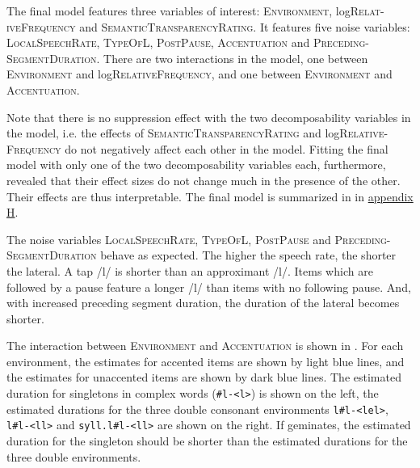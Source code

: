 The final model features three variables of interest: \textsc{Environment}, log\textsc{Relat-iveFrequency} and \textsc{SemanticTransparencyRating}. It features five noise variables: \textsc{LocalSpeechRate}, \textsc{TypeOfL}, \textsc{PostPause}, \textsc{Accentuation} and \textsc{Preceding-SegmentDuration}. 
There are two interactions in the model, one between \textsc{Environment} and log\textsc{RelativeFrequency}, and one between \textsc{Environment} and \textsc{Accentuation}. 

Note that there is no suppression effect with the two decomposability variables in the model, i.e. the effects of  \textsc{SemanticTransparencyRating} and log\textsc{Relative- Frequency} do not negatively affect each other in the model. Fitting the final model with only one of the two decomposability variables each, furthermore, revealed that their effect sizes do not change much in the presence of the other. Their effects are thus interpretable.
The final model is summarized in  in \hyperref[Appendix H: Model Summaries Experiment]{appendix H}.

The noise variables \textsc{LocalSpeechRate}, \textsc{TypeOfL}, \textsc{PostPause} and \textsc{Preceding- SegmentDuration} behave as expected. The higher the speech rate, the shorter the lateral. A tap /l/ is shorter than an approximant /l/. Items which are followed by a pause feature a longer /l/ than items with no following pause. And, with increased preceding segment duration, the duration of the lateral becomes shorter.

\clearpage

The interaction between \textsc{Environment} and \textsc{Accentuation} is shown in . 
For each environment, the estimates for accented items are shown by light blue lines, and the estimates for unaccented items are shown by dark blue lines. The estimated duration for singletons in complex words (\texttt{\#l-<l>}) is shown on the left, the estimated durations for the three double consonant environments \texttt{l\#l-<lel>}, \texttt{l\#l-<ll>} and \texttt{syll.l\#l-<ll>} are shown on the right. If  geminates, the estimated duration for the singleton should be shorter than the estimated durations for the three double environments. 


